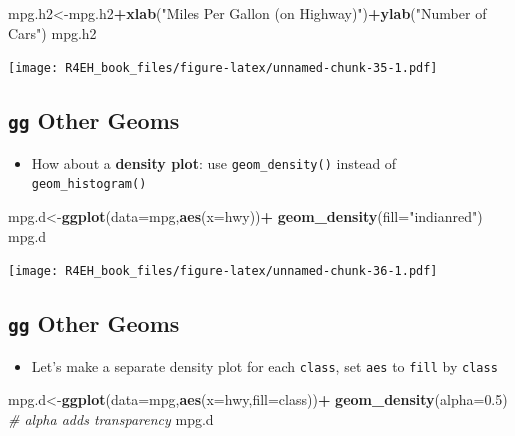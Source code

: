 \documentclass[]{book}
\newenvironment{Shaded}{\begin{snugshade}}{\end{snugshade}}
\newcommand{\KeywordTok}[1]{\textcolor[rgb]{0.13,0.29,0.53}{\textbf{#1}}}
\newcommand{\DataTypeTok}[1]{\textcolor[rgb]{0.13,0.29,0.53}{#1}}
\newcommand{\FloatTok}[1]{\textcolor[rgb]{0.00,0.00,0.81}{#1}}
\newcommand{\StringTok}[1]{\textcolor[rgb]{0.31,0.60,0.02}{#1}}
\newcommand{\CommentTok}[1]{\textcolor[rgb]{0.56,0.35,0.01}{\textit{#1}}}
\newcommand{\OperatorTok}[1]{\textcolor[rgb]{0.81,0.36,0.00}{\textbf{#1}}}
\newcommand{\NormalTok}[1]{#1}
\providecommand{\tightlist}{%
  \setlength{\itemsep}{0pt}\setlength{\parskip}{0pt}}
\theoremstyle{definition}
\theoremstyle{definition}
\theoremstyle{definition}
\theoremstyle{remark}
\begin{document}
\begin{Shaded}
\begin{Highlighting}[]
\NormalTok{mpg.h2<-mpg.h2}\OperatorTok{+}\KeywordTok{xlab}\NormalTok{(}\StringTok{"Miles Per Gallon (on Highway)"}\NormalTok{)}\OperatorTok{+}\KeywordTok{ylab}\NormalTok{(}\StringTok{"Number of Cars"}\NormalTok{)}
\NormalTok{mpg.h2}
\end{Highlighting}
\end{Shaded}

\texttt{[image: R4EH\_book\_files/figure-latex/unnamed-chunk-35-1.pdf]}

\subsection{\texorpdfstring{\texttt{gg} Other
Geoms}{gg Other Geoms}}\label{gg-other-geoms}

\begin{itemize}
\tightlist
\item
  How about a \textbf{density plot}: use \texttt{geom\_density()}
  instead of \texttt{geom\_histogram()}
\end{itemize}

\begin{Shaded}
\begin{Highlighting}[]
\NormalTok{mpg.d<-}\KeywordTok{ggplot}\NormalTok{(}\DataTypeTok{data=}\NormalTok{mpg,}\KeywordTok{aes}\NormalTok{(}\DataTypeTok{x=}\NormalTok{hwy))}\OperatorTok{+}
\StringTok{  }\KeywordTok{geom_density}\NormalTok{(}\DataTypeTok{fill=}\StringTok{"indianred"}\NormalTok{)}
\NormalTok{mpg.d}
\end{Highlighting}
\end{Shaded}

\texttt{[image: R4EH\_book\_files/figure-latex/unnamed-chunk-36-1.pdf]}

\subsection{\texorpdfstring{\texttt{gg} Other
Geoms}{gg Other Geoms}}\label{gg-other-geoms-1}

\begin{itemize}
\tightlist
\item
  Let's make a separate density plot for each \texttt{class}, set
  \texttt{aes} to \texttt{fill} by \texttt{class}
\end{itemize}

\begin{Shaded}
\begin{Highlighting}[]
\NormalTok{mpg.d<-}\KeywordTok{ggplot}\NormalTok{(}\DataTypeTok{data=}\NormalTok{mpg,}\KeywordTok{aes}\NormalTok{(}\DataTypeTok{x=}\NormalTok{hwy,}\DataTypeTok{fill=}\NormalTok{class))}\OperatorTok{+}
\StringTok{  }\KeywordTok{geom_density}\NormalTok{(}\DataTypeTok{alpha=}\FloatTok{0.5}\NormalTok{) }\CommentTok{# alpha adds transparency}
\NormalTok{mpg.d}
\end{Highlighting}
\end{Shaded}
\end{document}
